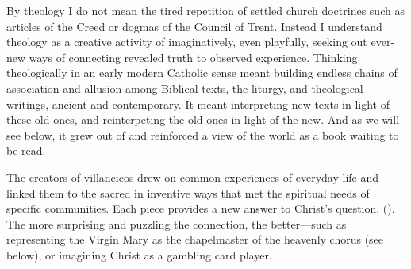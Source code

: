 By theology I do not mean the tired repetition of settled church doctrines such
as articles of the Creed or dogmas of the Council of Trent.
Instead I understand theology as a creative activity of imaginatively, even
playfully, seeking out ever-new ways of connecting revealed truth to observed
experience.
Thinking theologically in an early modern Catholic sense meant building 
endless chains of association and allusion among Biblical texts, the liturgy,
and theological writings, ancient and contemporary.
It meant interpreting new texts in light of these old ones, and reinterpeting
the old ones in light of the new.
And as we will see below, it grew out of and reinforced a view of the world as
a book waiting to be read.

The creators of villancicos drew on common experiences of everyday life and
linked them to the sacred in inventive ways that met the spiritual needs of
specific communities.
Each piece provides a new answer to Christ's question, 
().
The more surprising and puzzling the connection, the better---such as
representing the Virgin Mary as the chapelmaster of the heavenly chorus (see
below), or imagining Christ as a gambling card player.%
    \Autocite{Cashner:Cards}

